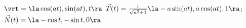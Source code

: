 {$\vrt = \la \cos (at),\sin (at),t \ra$
}
{$\vec T(t) = \frac{1}{\sqrt{a^2+1}}\la -a\sin (at),a\cos (at),1 \ra$; $\vec N(t) = \la  -\cos t,-\sin t,0\ra$
}